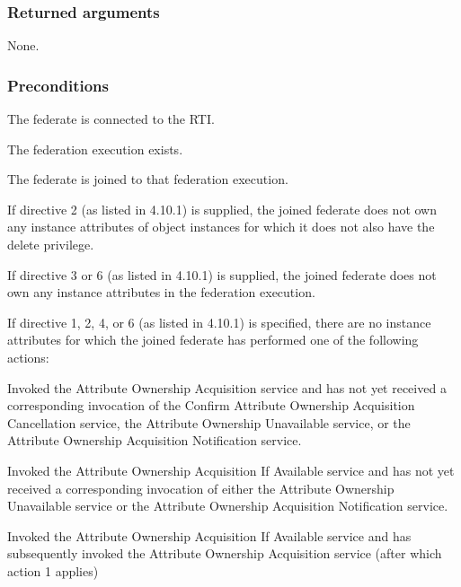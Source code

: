\subsubsection{Returned arguments}

\begin{stdalphalist}
    \item None.
\end{stdalphalist}

\subsubsection{Preconditions}

\begin{stdalphalist}
    \item The federate is connected to the RTI.
    \item The federation execution exists.
    \item The federate is joined to that federation execution.
    \item If directive 2 (as listed in 4.10.1) is supplied, the joined federate does not own any instance attributes of object instances for which it does not also have the delete privilege.
    \item If directive 3 or 6 (as listed in 4.10.1) is supplied, the joined federate does not own any instance attributes in the federation execution.
    \item If directive 1, 2, 4, or 6 (as listed in 4.10.1) is specified, there are no instance attributes for which the joined federate has performed one of the following actions:
    \begin{stdnumlist}
        \item Invoked the Attribute Ownership Acquisition service and has not yet received a corresponding invocation of the Confirm Attribute Ownership Acquisition Cancellation \rtiinitiated{} service, the Attribute Ownership Unavailable \rtiinitiated{} service, or the Attribute Ownership Acquisition Notification \rtiinitiated{} service.
        \item Invoked the Attribute Ownership Acquisition If Available service and has not yet received a corresponding invocation of either the Attribute Ownership Unavailable \rtiinitiated{} service or the Attribute Ownership Acquisition Notification \rtiinitiated{} service.
        \item Invoked the Attribute Ownership Acquisition If Available service and has subsequently invoked the Attribute Ownership Acquisition service (after which action 1 applies)
    \end{stdnumlist}
\end{stdalphalist}

